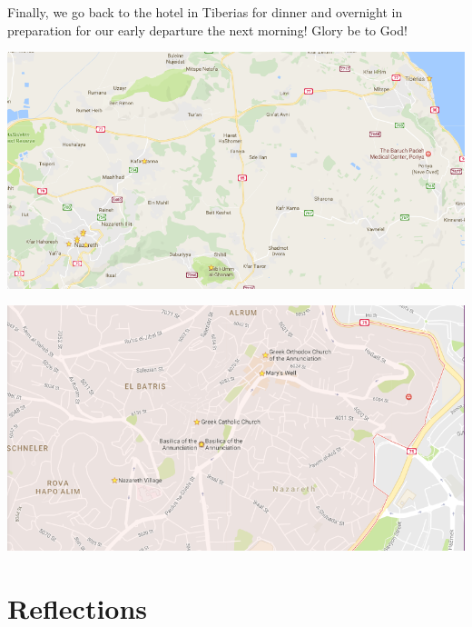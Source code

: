 \documentclass[letterpaper]{report}
\begin{document}
Finally, we go back to the hotel in Tiberias for dinner and overnight in
preparation for our early departure the next morning! Glory be to God!

\includegraphics[width=\textwidth]{TiberiasCanaNazarethTabor}

\includegraphics[width=\textwidth]{Nazareth}


\clearpage

\chapter{Reflections}
\end{document}
